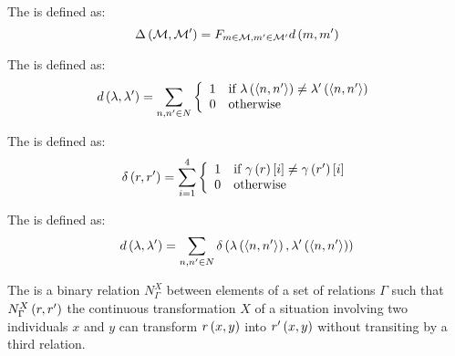 \begin{defi}
The  is defined as:
\begin{equation}
\Delta\left(\mathcal{M},\mathcal{M}'\right)=F_{m\in\mathcal{M},m'\in\mathcal{M}'}d\left(m,m'\right)
\end{equation}
\cite{conf/ijcai/EuzenatLD03}
\end{defi}

\begin{defi}
The  is defined as:
\begin{equation}
d\left(\lambda,\lambda'\right)=\displaystyle\sum_{n,n'\in N}\left\{\begin{array}{ll}
1&\mbox{if }\lambda\left(\left\langle n,n'\right\rangle\right)\neq\lambda'\left(\left\langle n,n'\right\rangle\right)\\
0&\mbox{otherwise}
\end{array}\right.
\end{equation}
\cite{conf/ijcai/EuzenatLD03}
\end{defi}

\begin{defi}
The  is defined as:
\begin{equation}
\delta\left(r,r'\right)=\displaystyle\sum_{i=1}^4\left\{\begin{array}{ll}
1&\mbox{if }\gamma\left(r\right)\left[ i\right]\neq\gamma\left(r'\right)\left[ i\right]\\
0&\mbox{otherwise}
\end{array}\right.
\end{equation}
\cite{conf/ijcai/EuzenatLD03}
\end{defi}

\begin{defi}
The  is defined as:
\begin{equation}
d\left(\lambda,\lambda'\right)=\displaystyle\sum_{n,n'\in N}\delta\left(\lambda\left(\left\langle n,n'\right\rangle\right),\lambda'\left(\left\langle n,n'\right\rangle\right)\right)
\end{equation}
\cite{conf/ijcai/EuzenatLD03}
\end{defi}

\begin{defi}
The  is a binary relation $N_{\Gamma}^X$ between elements of a set of relations $\Gamma$ such that $N_{\Gamma}^X\left(r,r'\right)$ \iffTx{} the continuous transformation $X$ of a situation involving two individuals $x$ and $y$ can transform $r\left(x,y\right)$ into $r'\left(x,y\right)$ without transiting by a third relation.
\cite{conf/ijcai/EuzenatLD03}
\end{defi}

